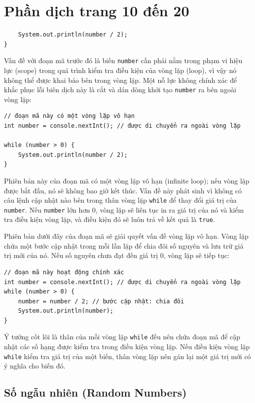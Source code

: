 \section{Phần dịch trang 10 đến 20}
\begin{verbatim}
    System.out.println(number / 2);
}
\end{verbatim}

Vấn đề với đoạn mã trước đó là biến \texttt{number} cần phải nằm trong phạm vi hiệu lực (scope) trong quá trình kiểm tra điều kiện của vòng lặp (loop), vì vậy nó không thể được khai báo bên trong vòng lặp. Một nỗ lực không chính xác để khắc phục lỗi biên dịch này là cắt và dán dòng khởi tạo \texttt{number} ra bên ngoài vòng lặp:

\begin{verbatim}
// đoạn mã này có một vòng lặp vô hạn
int number = console.nextInt(); // được di chuyển ra ngoài vòng lặp 
 
while (number > 0) {
    System.out.println(number / 2);
}
\end{verbatim}

Phiên bản này của đoạn mã có một vòng lặp vô hạn (infinite loop); nếu vòng lặp được bắt đầu, nó sẽ không bao giờ kết thúc. Vấn đề này phát sinh vì không có câu lệnh cập nhật nào bên trong thân vòng lặp \texttt{while} để thay đổi giá trị của \texttt{number}. Nếu \texttt{number} lớn hơn 0, vòng lặp sẽ liên tục in ra giá trị của nó và kiểm tra điều kiện vòng lặp, và điều kiện đó sẽ luôn trả về kết quả là \texttt{true}.

Phiên bản dưới đây của đoạn mã sẽ giải quyết vấn đề vòng lặp vô hạn. Vòng lặp chứa một bước cập nhật trong mỗi lần lặp để chia đôi số nguyên và lưu trữ giá trị mới của nó. Nếu số nguyên chưa đạt đến giá trị 0, vòng lặp sẽ tiếp tục:

\begin{verbatim}
// đoạn mã này hoạt động chính xác
int number = console.nextInt(); // được di chuyển ra ngoài vòng lặp
while (number > 0) {
    number = number / 2; // bước cập nhật: chia đôi
    System.out.println(number);
}
\end{verbatim}

Ý tưởng cốt lõi là thân của mỗi vòng lặp \texttt{while} đều nên chứa đoạn mã để cập nhật các số hạng được kiểm tra trong điều kiện vòng lặp. Nếu điều kiện vòng lặp \texttt{while} kiểm tra giá trị của một biến, thân vòng lặp nên gán lại một giá trị mới có ý nghĩa cho biến đó.

\subsection*{Số ngẫu nhiên (Random Numbers)}

